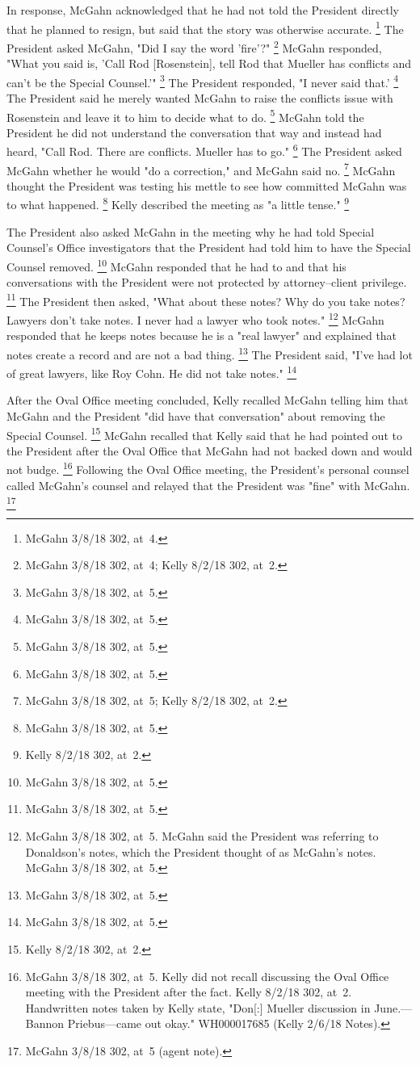 {In response, McGahn acknowledged that he had not told the President directly that he planned to resign, but said that the story was otherwise accurate.%
\footnote{McGahn 3/8/18 302, at~4.}
The President asked McGahn, "Did I say the word 'fire'?"%
\footnote{McGahn 3/8/18 302, at~4; Kelly 8/2/18 302, at~2.}
McGahn responded, "What you said is, 'Call Rod [Rosenstein], tell Rod that Mueller has conflicts and can't be the Special Counsel.'"%
\footnote{McGahn 3/8/18 302, at~5.}
The President responded, "I never said that.'%
\footnote{McGahn 3/8/18 302, at~5.}
The President said he merely wanted McGahn to raise the conflicts issue with Rosenstein and leave it to him to decide what to do.%
\footnote{McGahn 3/8/18 302, at~5.}
McGahn told the President he did not understand the conversation that way and instead had heard, "Call Rod.
There are conflicts.
Mueller has to go."%
\footnote{McGahn 3/8/18 302, at~5.}
The President asked McGahn whether he would "do a correction," and McGahn said no.%
\footnote{McGahn 3/8/18 302, at~5; Kelly 8/2/18 302, at~2.}
McGahn thought the President was testing his mettle to see how committed McGahn was to what happened.%
\footnote{McGahn 3/8/18 302, at~5.}
Kelly described the meeting as "a little tense."%
\footnote{Kelly 8/2/18 302, at~2.}

The President also asked McGahn in the meeting why he had told Special Counsel's Office investigators that the President had told him to have the Special Counsel removed.%
\footnote{McGahn 3/8/18 302, at~5.}
McGahn responded that he had to and that his conversations with the President were not protected by attorney--client privilege.%
\footnote{McGahn 3/8/18 302, at~5.}
The President then asked, "What about these notes? Why do you take notes? Lawyers don't take notes.
I never had a lawyer who took notes."%
\footnote{McGahn 3/8/18 302, at~5.
McGahn said the President was referring to Donaldson's notes, which the President thought of as McGahn's notes.
McGahn 3/8/18 302, at~5.}
McGahn responded that he keeps notes because he is a "real lawyer" and explained that notes create a record and are not a bad thing.%
\footnote{McGahn 3/8/18 302, at~5.}
The President said, "I've had lot of great lawyers, like Roy Cohn.
He did not take notes."%
\footnote{McGahn 3/8/18 302, at~5.}

After the Oval Office meeting concluded, Kelly recalled McGahn telling him that McGahn and the President "did have that conversation" about removing the Special Counsel.%
\footnote{Kelly 8/2/18 302, at~2.}
McGahn recalled that Kelly said that he had pointed out to the President after the Oval Office that McGahn had not backed down and would not budge.%
\footnote{McGahn 3/8/18 302, at~5.
Kelly did not recall discussing the Oval Office meeting with the President after the fact.
Kelly 8/2/18 302, at~2.
Handwritten notes taken by Kelly state, "Don[:] Mueller discussion in June.---Bannon Priebus---came out okay."
WH000017685 (Kelly 2/6/18 Notes).}
Following the Oval Office meeting, the President's personal counsel called McGahn's counsel and relayed that the President was "fine" with McGahn.%
\footnote{McGahn 3/8/18 302, at~5 (agent note).}

}
